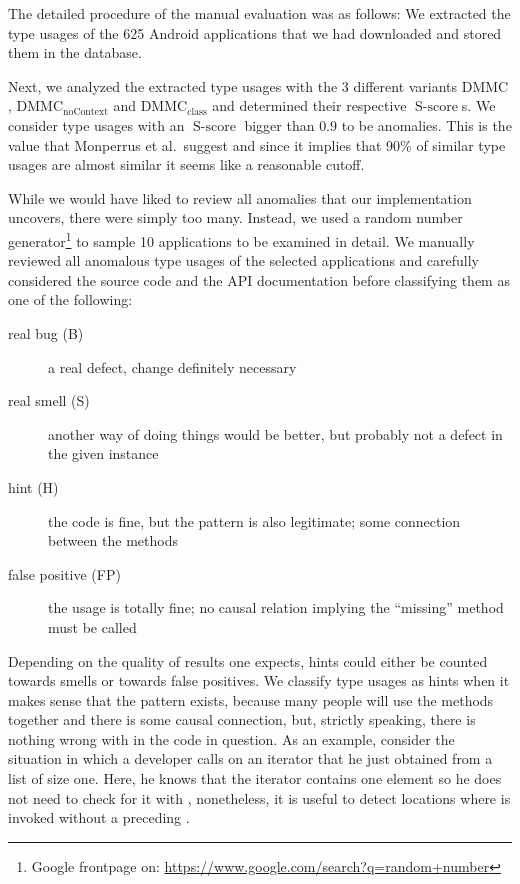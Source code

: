The detailed procedure of the manual evaluation was as follows:
We extracted the type usages of the 625 Android applications that we had downloaded and stored them in the database.

Next, we analyzed the extracted type usages with the 3 different variants $\text{DMMC}$, $\text{DMMC}_{\text{noContext}}$ and $\text{DMMC}_{\text{class}}$ and determined their respective $\operatorname{S-score}$s.
We consider type usages with an $\operatorname{S-score}$ bigger than $0.9$ to be anomalies.
This is the value that Monperrus et al.\ suggest and since it implies that 90\% of similar type usages are almost similar it seems like a reasonable cutoff.

While we would have liked to review all anomalies that our implementation uncovers, there were simply too many.
Instead, we used a random number generator\footnote{Google frontpage on: \url{https://www.google.com/search?q=random+number}} to sample 10 applications to be examined in detail.
We manually reviewed all anomalous type usages of the selected applications and carefully considered the source code and the API documentation before classifying them as one of the following:
\begin{description}
    \item [real bug (B)] a real defect, change definitely necessary
    \item [real smell (S)] another way of doing things would be better, but probably not a defect in the given instance
    \item [hint (H)] the code is fine, but the pattern is also legitimate; some connection between the methods
    \item [false positive (FP)] the usage is totally fine; no causal relation implying the ``missing'' method must be called
\end{description}


Depending on the quality of results one expects, hints could either be counted towards smells or towards false positives.
We classify type usages as hints when it makes sense that the pattern exists, because many people will use the methods together and there is some causal connection, but, strictly speaking, there is nothing wrong with in the code in question.
As an example, consider the situation in which a developer calls  on an iterator that he just obtained from a list of size one.
Here, he knows that the iterator contains one element so he does not need to check for it with , nonetheless, it is useful to detect locations where  is invoked without a preceding .

